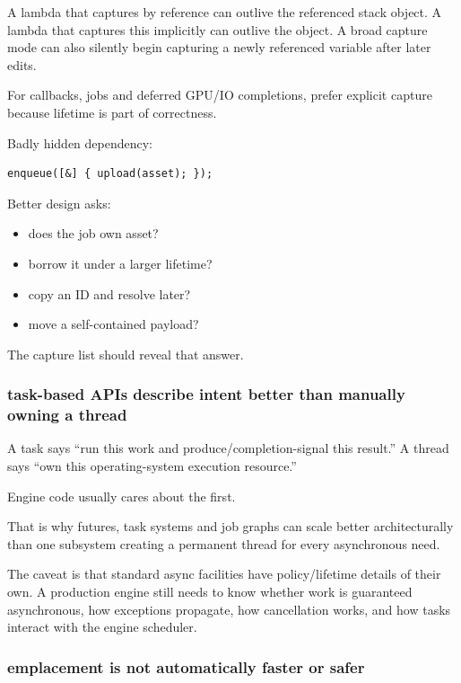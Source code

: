 A lambda that captures by reference can outlive the referenced stack object. A lambda that captures this implicitly can outlive the object. A broad capture mode can also silently begin capturing a newly referenced variable after later edits.

For callbacks, jobs and deferred GPU/IO completions, prefer explicit capture because lifetime is part of correctness.

Badly hidden dependency:

\begin{verbatim}
enqueue([&] { upload(asset); });
\end{verbatim}

Better design asks:

\begin{itemize}
\tightlist
\item
  does the job own asset?
\item
  borrow it under a larger lifetime?
\item
  copy an ID and resolve later?
\item
  move a self-contained payload?
\end{itemize}

The capture list should reveal that answer.

\subsubsection{task-based APIs describe intent better than manually owning a thread}\label{01-foundations-i-ch005-task-based-apis-describe-intent-better-than-manually-owning-a-thread}

A task says ``run this work and produce/completion-signal this result.'' A thread says ``own this operating-system execution resource.''

Engine code usually cares about the first.

That is why futures, task systems and job graphs can scale better architecturally than one subsystem creating a permanent thread for every asynchronous need.

The caveat is that standard async facilities have policy/lifetime details of their own. A production engine still needs to know whether work is guaranteed asynchronous, how exceptions propagate, how cancellation works, and how tasks interact with the engine scheduler.

\subsubsection{emplacement is not automatically faster or safer}\label{01-foundations-i-ch005-emplacement-is-not-automatically-faster-or-safer}

